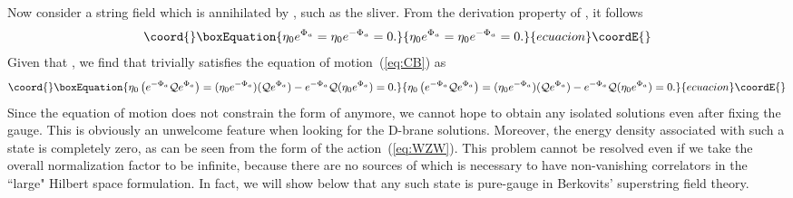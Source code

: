 \documentclass[a4paper,12pt]{article}
\providecommand{\cQ}{\mathcal{Q}}
\begin{document}
Now consider a string field \coordHE{} which is annihilated by \coordHE{}, such as the sliver. 
From the derivation property of \coordHE{}, it follows 
\begin{equation}\coord{}\boxEquation{
\eta_0 e^{\Phi_a}=\eta_0 e^{-\Phi_a}=0. \label{eq:RA}
}{
\eta_0 e^{\Phi_a}=\eta_0 e^{-\Phi_a}=0. }{ecuacion}\coordE{}\end{equation}
Given that \myHighlight{$\{\eta_0,\cQ\}=0$}\coordHE{}, we find that \coordHE{} trivially satisfies the equation 
of motion~(\ref{eq:CB}) as 
\begin{equation}\coord{}\boxEquation{
\eta_0\left(e^{-\Phi_a}\cQ e^{\Phi_a}\right)=(\eta_0 e^{-\Phi_a})(\cQ e^{\Phi_a})-e^{-\Phi_a}
\cQ (\eta_0 e^{\Phi_a})=0. \label{eq:RB}
}{
\eta_0\left(e^{-\Phi_a}\cQ e^{\Phi_a}\right)=(\eta_0 e^{-\Phi_a})(\cQ e^{\Phi_a})-e^{-\Phi_a}
\cQ (\eta_0 e^{\Phi_a})=0. }{ecuacion}\coordE{}\end{equation}
Since the equation of motion does not constrain the form of \coordHE{} anymore, we cannot 
hope to obtain any isolated solutions even after fixing the gauge. 
This is obviously an unwelcome feature when looking for the D-brane solutions. 
Moreover, the energy density associated with such a state is completely zero, as can be 
seen from the form of the action~(\ref{eq:WZW}). This problem cannot be resolved even if 
we take the overall normalization factor \coordHE{} to be infinite, because there are no sources 
of \coordHE{} which is necessary to have non-vanishing correlators in the ``large" Hilbert space 
formulation. In fact, we will show below that 
any such state \coordHE{} is pure-gauge in Berkovits' superstring field theory. 
\smallskip
\end{document}
